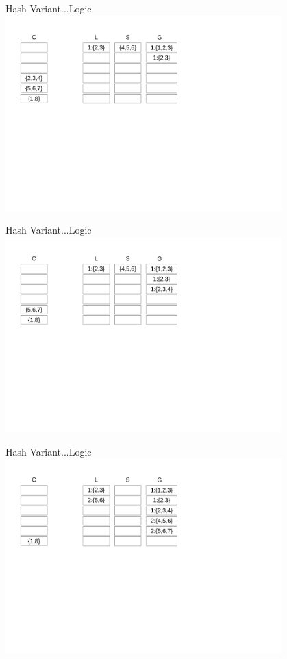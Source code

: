 \documentclass{beamer}
\begin{document}
\begin{frame}{Hash Variant...}{Logic}
    \centering
    \includegraphics[trim={1cm 10cm 11cm 1cm}, clip,width=0.8\textwidth]{figures/L4} 
\end{frame}
\begin{frame}{Hash Variant...}{Logic}
    \centering
    \includegraphics[trim={1cm 10cm 11cm 1cm}, clip,width=0.8\textwidth]{figures/L5} 
\end{frame}
\begin{frame}{Hash Variant...}{Logic}
    \centering
    \includegraphics[trim={1cm 10cm 11cm 1cm}, clip,width=0.8\textwidth]{figures/L6} 
\end{frame}
\end{document}
